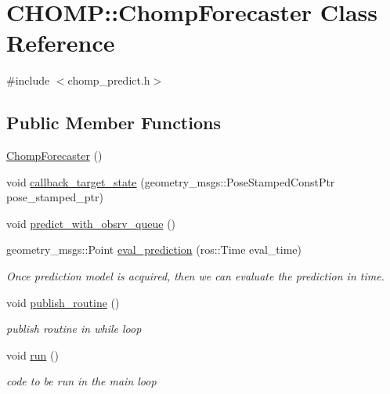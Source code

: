\hypertarget{class_c_h_o_m_p_1_1_chomp_forecaster}{}\section{C\+H\+O\+MP\+:\+:Chomp\+Forecaster Class Reference}
\label{class_c_h_o_m_p_1_1_chomp_forecaster}


{\ttfamily \#include $<$chomp\+\_\+predict.\+h$>$}

\subsection*{Public Member Functions}
\begin{DoxyCompactItemize}
\item 
\hyperlink{class_c_h_o_m_p_1_1_chomp_forecaster_a58176b34170de8485029f182e05f12c5}{Chomp\+Forecaster} ()
\item 
void \hyperlink{class_c_h_o_m_p_1_1_chomp_forecaster_ac05e634464c8859c8cc3e8bdb1a40ded}{callback\+\_\+target\+\_\+state} (geometry\+\_\+msgs\+::\+Pose\+Stamped\+Const\+Ptr pose\+\_\+stamped\+\_\+ptr)
\item 
void \hyperlink{class_c_h_o_m_p_1_1_chomp_forecaster_a02a3930b78aaf72a9058cb3ce6ae8143}{predict\+\_\+with\+\_\+obsrv\+\_\+queue} ()
\item 
geometry\+\_\+msgs\+::\+Point \hyperlink{class_c_h_o_m_p_1_1_chomp_forecaster_a8b3e5ea0d8a5092b371a23efcddd5c73}{eval\+\_\+prediction} (ros\+::\+Time eval\+\_\+time)
\begin{DoxyCompactList}\small\item\em Once prediction model is acquired, then we can evaluate the prediction in time. \end{DoxyCompactList}\item 
void \hyperlink{class_c_h_o_m_p_1_1_chomp_forecaster_a56e9984f3c85563170c58708aaa97056}{publish\+\_\+routine} ()
\begin{DoxyCompactList}\small\item\em publish routine in while loop \end{DoxyCompactList}\item 
void \hyperlink{class_c_h_o_m_p_1_1_chomp_forecaster_af225bf2af3fede364b922e27be410f0b}{run} ()
\begin{DoxyCompactList}\small\item\em code to be run in the main loop \end{DoxyCompactList}\end{DoxyCompactItemize}
